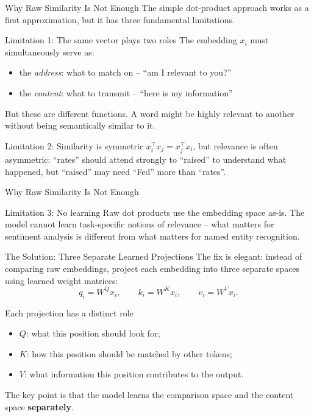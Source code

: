 \documentclass[aspectratio=169]{beamer}
\begin{document}
\begin{frame}{Why Raw Similarity Is Not Enough}
  The simple dot-product approach works as a first approximation, but it has three
  fundamental limitations.

  \vspace{0.4em}
  \begin{alertblock}{Limitation 1: The same vector plays two roles}
    The embedding $x_i$ must simultaneously serve as:
    \begin{itemize}
      \item the \emph{address}: what to match on – ``am I relevant to you?''
      \item the \emph{content}: what to transmit – ``here is my information''
    \end{itemize}
    But these are different functions.  A word might be highly relevant to another
    without being semantically similar to it.
  \end{alertblock}

  \vspace{0.4em}
  \begin{alertblock}{Limitation 2: Similarity is symmetric}
    $x_i^\top x_j = x_j^\top x_i$, but relevance is often asymmetric:
    ``rates'' should attend strongly to ``raised'' to understand what happened, but
    ``raised'' may need ``Fed'' more than ``rates''.
  \end{alertblock}
\end{frame}
%
%
\begin{frame}{Why Raw Similarity Is Not Enough}
  \begin{alertblock}{Limitation 3: No learning}
    Raw dot products use the embedding space as-is.  The model cannot learn
    task-specific notions of relevance – what matters for sentiment analysis is
    different from what matters for named entity recognition.
  \end{alertblock}
\end{frame}
%
%
\begin{frame}{The Solution: Three Separate Learned Projections}
  The fix is elegant: instead of comparing raw embeddings, project each embedding into
  three separate spaces using learned weight matrices:
  \[
    q_i = W^Q x_i, \qquad k_i = W^K x_i, \qquad v_i = W^V x_i.
  \]

  \begin{block}{Each projection has a distinct role}
    \begin{itemize}
      \item $Q$: what this position should look for;
      \item $K$: how this position should be matched by other tokens;
      \item $V$: what information this position contributes to the output.
    \end{itemize}
  \end{block}

  The key point is that the model learns the comparison space and the content space
  \textbf{separately}.
\end{frame}
\end{document}
